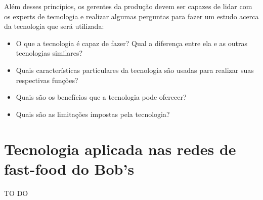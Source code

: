 		Além desses princípios, os gerentes da produção devem ser capazes de lidar com os experts de tecnologia e realizar algumas perguntas para fazer um estudo acerca da tecnologia que será utilizada: 

		\begin{itemize}
			\item{O que a tecnologia é capaz de fazer? Qual a diferença entre ela e as outras tecnologias similares?}
			\item{Quais características particulares da tecnologia são usadas para realizar suas respectivas funções?}
			\item{Quais são os benefícios que a tecnologia pode oferecer?}
			\item{Quais são as limitações impostas pela tecnologia?}
		\end{itemize}

	\section[Tecnologia aplicada nas redes de fast-food do Bob's]{Tecnologia aplicada nas redes de fast-food do Bob's}
	\label{sec:tecnologias_aplicadas}

		TO DO
	